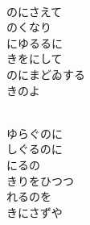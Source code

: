 \documentclass[10pt,b5j]{tarticle} %
\begin{document}
\begin{enumerate}
\begin{minipage}[c]{\blocksize}
        \vspace{\linespace}
        \item~\\
        のにさえて\\
        のくなり\\
        にゆるるに\\
        きをにして\\
        のにまどゐする\\
        きのよ
        
        \vspace{\linespace}
        \item~\\
        ゆらぐのに\\
        しぐるのに\\
        にるの\\
        きりをひつつ\\
        れるのを\\
        きにさずや
    
    \end{minipage}
\end{enumerate} %
\end{document}
